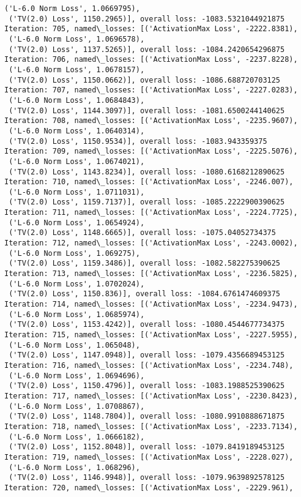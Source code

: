 \documentclass[10pt]{article}
\begin{document}
\begin{Verbatim}[commandchars=\\\{\}]
 ('L-6.0 Norm Loss', 1.0669795),
 ('TV(2.0) Loss', 1150.2965)], overall loss: -1083.5321044921875
Iteration: 705, named\_losses: [('ActivationMax Loss', -2222.8381),
 ('L-6.0 Norm Loss', 1.0696578),
 ('TV(2.0) Loss', 1137.5265)], overall loss: -1084.2420654296875
Iteration: 706, named\_losses: [('ActivationMax Loss', -2237.8228),
 ('L-6.0 Norm Loss', 1.0678157),
 ('TV(2.0) Loss', 1150.0662)], overall loss: -1086.688720703125
Iteration: 707, named\_losses: [('ActivationMax Loss', -2227.0283),
 ('L-6.0 Norm Loss', 1.0684843),
 ('TV(2.0) Loss', 1144.3097)], overall loss: -1081.6500244140625
Iteration: 708, named\_losses: [('ActivationMax Loss', -2235.9607),
 ('L-6.0 Norm Loss', 1.0640314),
 ('TV(2.0) Loss', 1150.9534)], overall loss: -1083.943359375
Iteration: 709, named\_losses: [('ActivationMax Loss', -2225.5076),
 ('L-6.0 Norm Loss', 1.0674021),
 ('TV(2.0) Loss', 1143.8234)], overall loss: -1080.6168212890625
Iteration: 710, named\_losses: [('ActivationMax Loss', -2246.007),
 ('L-6.0 Norm Loss', 1.0711031),
 ('TV(2.0) Loss', 1159.7137)], overall loss: -1085.2222900390625
Iteration: 711, named\_losses: [('ActivationMax Loss', -2224.7725),
 ('L-6.0 Norm Loss', 1.0654924),
 ('TV(2.0) Loss', 1148.6665)], overall loss: -1075.04052734375
Iteration: 712, named\_losses: [('ActivationMax Loss', -2243.0002),
 ('L-6.0 Norm Loss', 1.069275),
 ('TV(2.0) Loss', 1159.3486)], overall loss: -1082.582275390625
Iteration: 713, named\_losses: [('ActivationMax Loss', -2236.5825),
 ('L-6.0 Norm Loss', 1.0702024),
 ('TV(2.0) Loss', 1150.836)], overall loss: -1084.6761474609375
Iteration: 714, named\_losses: [('ActivationMax Loss', -2234.9473),
 ('L-6.0 Norm Loss', 1.0685974),
 ('TV(2.0) Loss', 1153.4242)], overall loss: -1080.4544677734375
Iteration: 715, named\_losses: [('ActivationMax Loss', -2227.5955),
 ('L-6.0 Norm Loss', 1.065048),
 ('TV(2.0) Loss', 1147.0948)], overall loss: -1079.4356689453125
Iteration: 716, named\_losses: [('ActivationMax Loss', -2234.748),
 ('L-6.0 Norm Loss', 1.0694696),
 ('TV(2.0) Loss', 1150.4796)], overall loss: -1083.1988525390625
Iteration: 717, named\_losses: [('ActivationMax Loss', -2230.8423),
 ('L-6.0 Norm Loss', 1.0708867),
 ('TV(2.0) Loss', 1148.7804)], overall loss: -1080.9910888671875
Iteration: 718, named\_losses: [('ActivationMax Loss', -2233.7134),
 ('L-6.0 Norm Loss', 1.0666182),
 ('TV(2.0) Loss', 1152.8048)], overall loss: -1079.8419189453125
Iteration: 719, named\_losses: [('ActivationMax Loss', -2228.027),
 ('L-6.0 Norm Loss', 1.068296),
 ('TV(2.0) Loss', 1146.9948)], overall loss: -1079.9639892578125
Iteration: 720, named\_losses: [('ActivationMax Loss', -2229.961),

\end{Verbatim}
\end{document}
